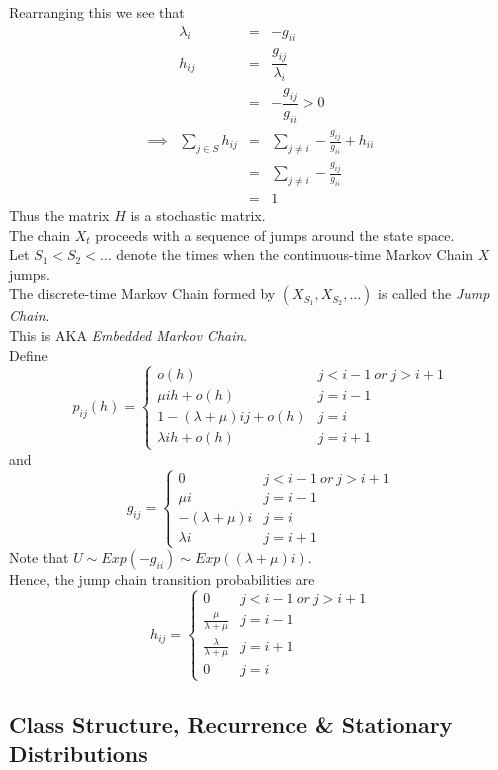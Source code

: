\documentclass[11pt,a4paper]{article}
\begin{document}
Rearranging this we see that
\[\begin{array}{rrcl}
&\lambda_i&=&-g_{ii}\\
&h_{ij}&=&\dfrac{g_{ij}}{\lambda_i}\\
&&=&-\dfrac{g_{ij}}{g_{ii}}>0\\
\implies&\sum_{j\in S}h_{ij}&=&\sum_{j\neq i}-\frac{g_{ij}}{g_{ii}}+h_{ii}\\
&&=&\sum_{j\neq i}-\frac{g_{ij}}{g_{ii}}\\
&&=&1
\end{array}\]
Thus the matrix $H$ is a stochastic matrix.\\
The chain $X_t$ proceeds with a sequence of jumps around the state space.\\

Let $S_1<S_2<\dots$ denote the times when the continuous-time Markov Chain $X$ jumps.\\
The discrete-time Markov Chain formed by $(X_{S_1},X_{S_2},\dots)$ is called the \textit{Jump Chain}.\\
\nb This is AKA \textit{Embedded Markov Chain}.\\

Define
$$p_{ij}(h)=\begin{cases}o(h)&j<i-1\ or\ j>i+1\\\mu ih+o(h)&j=i-1\\1-(\lambda+\mu)ij+o(h)&j=i\\\lambda ih+o(h)&j=i+1\end{cases}$$
and
$$g_{ij}=\begin{cases}0&j<i-1\ or\ j>i+1\\\mu i&j=i-1\\-(\lambda+\mu)i&j=i\\\lambda i&j=i+1\end{cases}$$
Note that $U\sim Exp(-g_{ii})\sim Exp((\lambda+\mu)i)$.\\
Hence, the jump chain transition probabilities are
$$h_{ij}=\begin{cases}0&j<i-1\ or\ j>i+1\\\frac{\mu}{\lambda+\mu}&j=i-1\\\frac{\lambda}{\lambda+\mu}&j=i+1\\0&j=i\end{cases}$$

\subsection{Class Structure, Recurrence \& Stationary Distributions}
\end{document}
